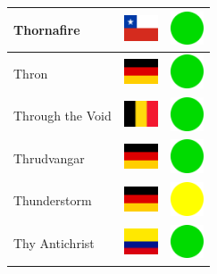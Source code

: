 \documentclass[12pt, a4paper, twoside]{report}
\begin{document}
\begin{center}
\begin{longtable}{|p{5cm}|p{2cm}|p{2cm}|}
 Thornafire                                                 & \includegraphics[width=1cm]{../4x3/cl} &   \includegraphics[width=1cm]{../likes/y} \\ \hline
 Thron                                                      & \includegraphics[width=1cm]{../4x3/de} &   \includegraphics[width=1cm]{../likes/y} \\ \hline
 Through the Void                                           & \includegraphics[width=1cm]{../4x3/be} &   \includegraphics[width=1cm]{../likes/y} \\ \hline
 Thrudvangar                                                & \includegraphics[width=1cm]{../4x3/de} &   \includegraphics[width=1cm]{../likes/y} \\ \hline
 Thunderstorm                                               & \includegraphics[width=1cm]{../4x3/de} &   \includegraphics[width=1cm]{../likes/m} \\ \hline
 Thy Antichrist                                             & \includegraphics[width=1cm]{../4x3/co} &   \includegraphics[width=1cm]{../likes/y} \\ \hline

\end{longtable}
\end{center}
\end{document}
